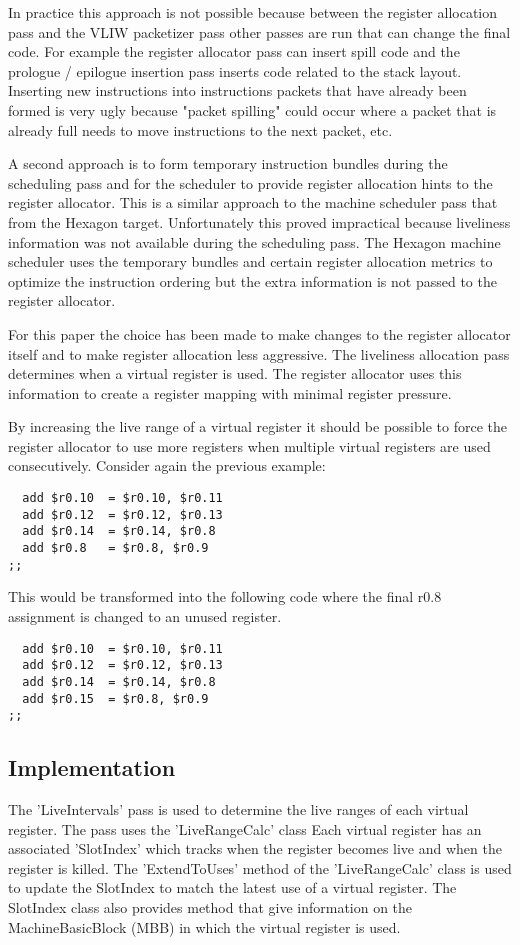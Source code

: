In practice this approach is not possible because between the register allocation pass and the VLIW packetizer pass other passes are run that can change the final code. For example the register allocator pass can insert spill code and the prologue / epilogue insertion pass inserts code related to the stack layout. Inserting new instructions into instructions packets that have already been formed is very ugly because "packet spilling" could occur where a packet that is already full needs to move instructions to the next packet, etc. 

A second approach is to form temporary instruction bundles during the scheduling pass and for the scheduler to provide register allocation hints to the register allocator. This is a similar approach to the machine scheduler pass that from the Hexagon target. Unfortunately this proved impractical because liveliness information was not available during the scheduling pass. The Hexagon machine scheduler uses the temporary bundles and certain register allocation metrics to optimize the instruction ordering but the extra information is not passed to the register allocator.

For this paper the choice has been made to make changes to the register allocator itself and to make register allocation less aggressive. The liveliness allocation pass determines when a virtual register is used. The register allocator uses this information to create a register mapping with minimal register pressure.

By increasing the live range of a virtual register it should be possible to force the register allocator to use more registers when multiple virtual registers are used consecutively. Consider again the previous example:

\begin{lstlisting}
  add $r0.10  = $r0.10, $r0.11
  add $r0.12  = $r0.12, $r0.13
  add $r0.14  = $r0.14, $r0.8
  add $r0.8   = $r0.8, $r0.9
;;
\end{lstlisting}

This would be transformed into the following code where the final r0.8 assignment is changed to an unused register. 

\begin{lstlisting}
  add $r0.10  = $r0.10, $r0.11
  add $r0.12  = $r0.12, $r0.13
  add $r0.14  = $r0.14, $r0.8
  add $r0.15  = $r0.8, $r0.9
;;
\end{lstlisting}

\subsection{Implementation} %
\label{sub:implementation}
The 'LiveIntervals' pass is used to determine the live ranges of each virtual register. The pass uses the 'LiveRangeCalc' class
Each virtual register has an associated 'SlotIndex' which tracks when the register becomes live and when the register is killed. The 'ExtendToUses' method of the 'LiveRangeCalc' class is used to update the SlotIndex to match the latest use of a virtual register. The SlotIndex class also provides method that give information on the MachineBasicBlock (MBB) in which the virtual register is used.


